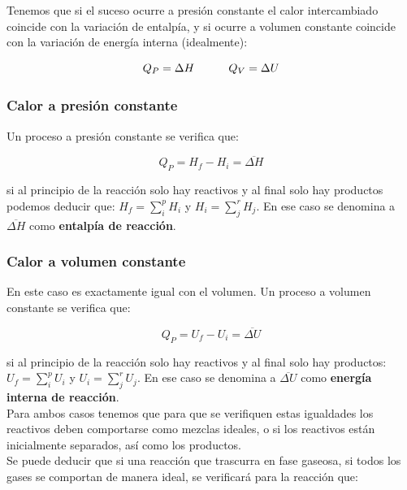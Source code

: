 \documentclass[12pt]{book}
\begin{document}
Tenemos que si el suceso ocurre a presión constante el calor intercambiado coincide con la variación de entalpía, y si ocurre a volumen constante coincide con la variación de energía interna (idealmente):

\begin{equation}
Q_P = \Delta H  \quad \quad \quad Q_V = \Delta U
\end{equation}

\subsubsection*{Calor a presión constante}

Un proceso a presión constante se verifica que:

\begin{equation}
Q_P = H_f - H_i = \overline{\Delta H}
\end{equation}

si al principio de la reacción solo hay reactivos y al final solo hay productos podemos deducir que: $H_f = \sum_i^p H_i $  y $H_i = \sum_j^r H_j$. En ese caso se denomina a $\overline{\Delta H}$ como \textbf{entalpía de reacción}. 


\subsubsection*{Calor a volumen constante}

En este caso es exactamente igual con el volumen. Un proceso a volumen constante se verifica que:

\begin{equation}
Q_P = U_f - U_i = \overline{\Delta U}
\end{equation}

si al principio de la reacción solo hay reactivos y al final solo hay productos: $U_f = \sum_i^p U_i $  y $U_i = \sum_j^r U_j$. En ese caso se denomina a $\overline{\Delta U}$ como \textbf{energía interna de reacción}. \\



Para ambos casos tenemos que para que se verifiquen estas igualdades los reactivos deben comportarse como mezclas ideales, o si los reactivos están inicialmente separados, así como los productos.\\

Se puede deducir que si una reacción que trascurra en fase gaseosa, si todos los gases se comportan de manera ideal, se verificará para la reacción que:
\end{document}
